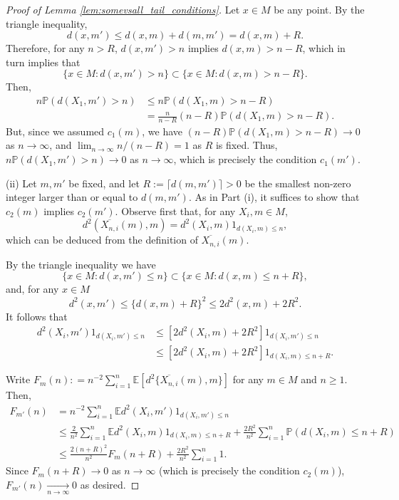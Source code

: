 \documentclass[preprint]{imsart}
\theoremstyle{plain}
\theoremstyle{remark}
\begin{document}
\begin{appendix}
\begin{proof}[Proof of Lemma \ref{lem:somevsall_tail_conditions}]
Let $x \in M$ be any point. 
By the triangle inequality, 
\begin{equation}
   d(x,m') \le d(x, m) + d(m,m') = d(x, m) + R. \label{eq:triangle}
\end{equation} 
Therefore, for any $n > R$, $d(x,m') > n$ implies $d(x,m)> n - R$, which in turn implies that 
$$\{x \in M: d(x,m') > n\} \subset \{x \in M: d(x,m)> n - R\}.$$
Then, 
\begin{align*}
    n\mathbb{P}(d(X_1,m')>n) & \le n\mathbb{P}(d(X_1,m)>n-R) \\
      & = \frac{n}{n-R} (n-R) \mathbb{P}(d(X_1,m)>n-R).
\end{align*}
But, since we assumed $c_1(m)$, we have $(n-R) \mathbb{P}(d(X_1,m)>n-R) \to 0$ as $n\to\infty$, and $\lim_{n\to\infty}{n}/({n-R})= 1$ as $R$ is fixed. Thus, $n\mathbb{P}(d(X_1,m')>n) \to 0$ as $n\to\infty$, which is precisely the condition $c_1(m')$. 

(ii) Let $m, m'$ be fixed, and let $R:= \lceil d(m,m') \rceil > 0$ be the smallest non-zero integer larger than or equal to $d(m,m')$. As in Part (i), it suffices to show that $c_2(m)$ implies $c_2(m')$. 
Observe first that, for any $X_i,m \in M$, 
$$d^2(\overline{X_{n,i}}(m),m) = d^2(X_i,m) 1_{d(X_i,m) \le n},$$
which can be deduced from the definition of $\overline{X_{n,i}}(m)$. 

By the triangle inequality %
we have 
$$\{x \in M: d(x,m') \le n\} \subset \{x \in M: d(x,m)\le n + R\},$$ 
and, for any $x \in M$ 
$$d^2(x,m') \le \{d(x,m) + R\}^2 \le 2d^2(x,m) + 2R^2.$$
It follows that
\begin{align*}
    d^2(X_i,m') 1_{d(X_i,m') \le n} 
    & \le [2d^2(X_i,m) + 2R^2]1_{d(X_i,m') \le n} \\ 
    & \le [2d^2(X_i,m) + 2R^2]1_{d(X_i,m)\le n + R}.
\end{align*}

Write $F_m(n) : = n^{-2}\sum_{i=1}^n\mathbb{E}[d^2\{\overline{X_{n,i}}(m),m\}]$ for any $m\in M$ and $n\ge 1$. Then, 
\begin{align*}
    F_{m'}(n) & = n^{-2}\sum_{i=1}^n\mathbb{E} d^2(X_i,m') 1_{d(X_i,m') \le n}  \\
    & \le \frac{2}{n^2}\sum_{i=1}^n\mathbb{E} d^2(X_i,m)1_{d(X_i,m)\le n + R} + \frac{2R^2}{n^2}\sum_{i=1}^n \mathbb{P}(d(X_i,m)\le n + R) \\ 
    & \le \frac{2(n+R)^2}{n^2}F_{m}(n+R) + \frac{2R^2}{n^2}\sum_{i=1}^n 1.
\end{align*}
Since $F_{m}(n+R) \to 0$ as $n\to \infty$ (which is precisely the condition $c_2(m)$), $F_{m'}(n) \underset{n\to \infty}{\to} 0$ as desired. 






\end{proof}
\end{appendix}
\end{document}
